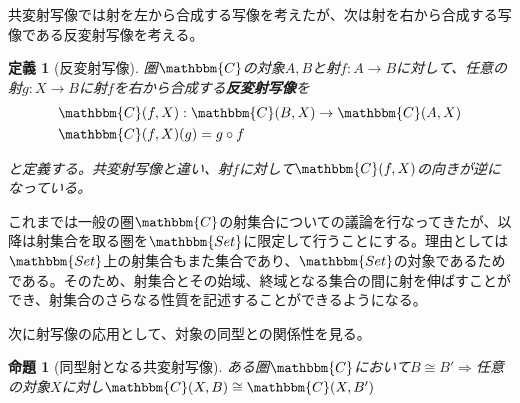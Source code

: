 \documentclass[uplatex,dvipdfmx]{jsarticle}
\newcommand{\cat}[1]{\mathbbm{#1}}
\newcommand{\arrow}{\rightarrow}
\newcommand{\mor}[3]{#1:#2\arrow #3}
\newcommand{\arset}[3]{\cat{#1}(#2,#3)}
\newtheorem{prop}[proof]{命題}
\newtheorem{define}[proof]{定義}
\numberwithin{proof}{subsection}
\begin{document}
  共変射写像では射を左から合成する写像を考えたが、次は射を右から合成する写像である反変射写像を考える。

	\begin{define}[反変射写像]
		圏$\cat{C}$の対象$A,B$と射$\mor{f}{A}{B}$に対して、任意の射$\mor{g}{X}{B}$に射$f$を右から合成する\textbf{反変射写像}を
		\begin{align*}
			&\mor{\arset{C}{f}{X}}{\arset{C}{B}{X}}{\arset{C}{A}{X}}\\
			&\arset{C}{f}{X}(g)=g\circ f
		\end{align*}
		\begin{center}
		\end{center}
		と定義する。共変射写像と違い、射$f$に対して$\arset{C}{f}{X}$の向きが逆になっている。
	\end{define}

  これまでは一般の圏$\cat{C}$の射集合についての議論を行なってきたが、以降は射集合を取る圏を$\cat{Set}$に限定して行うことにする。理由としては$\cat{Set}$上の射集合もまた集合であり、$\cat{Set}$の対象であるためである。そのため、射集合とその始域、終域となる集合の間に射を伸ばすことができ、射集合のさらなる性質を記述することができるようになる。

  次に射写像の応用として、対象の同型との関係性を見る。

  \begin{prop}[同型射となる共変射写像]ある圏$\cat{C}$において$B\cong B'\Longrightarrow$任意の対象$X$に対し$\arset{C}{X}{B}\cong\arset{C}{X}{B'}$
  \end{prop}
\end{document}
